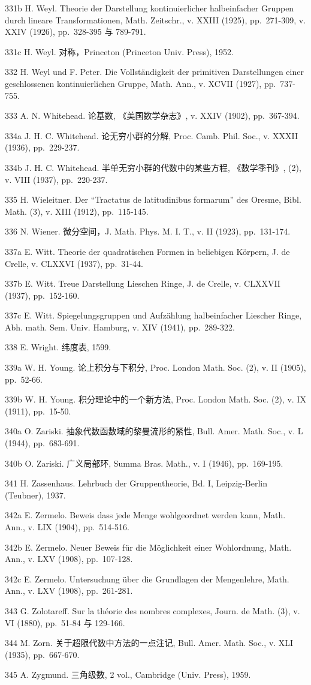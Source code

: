 331b H. Weyl. Theorie der Darstellung kontinuierlicher halbeinfacher Gruppen durch lineare Transformationen, Math. Zeitschr., v. XXIII (1925), pp.~271-309, v. XXIV (1926), pp.~328-395 与 789-791.

331c H. Weyl. 对称，Princeton (Princeton Univ. Press), 1952.

332 H. Weyl und F. Peter. Die Vollständigkeit der primitiven Darstellungen einer geschlossenen kontinuierlichen Gruppe, Math. Ann., v. XCVII (1927), pp.~737-755.

333 A. N. Whitehead. 论基数, 《美国数学杂志》, v. XXIV (1902), pp.~367-394.

334a J. H. C. Whitehead. 论无穷小群的分解, Proc. Camb. Phil. Soc., v. XXXII (1936), pp.~229-237.

334b J. H. C. Whitehead. 半单无穷小群的代数中的某些方程, 《数学季刊》, (2), v. VIII (1937), pp.~220-237.

335 H. Wieleitner. Der ``Tractatus de latitudinibus formarum'' des Oresme, Bibl. Math. (3), v. XIII (1912), pp.~115-145.

336 N. Wiener. 微分空间，J. Math. Phys. M. I. T., v. II (1923), pp.~131-174.

337a E. Witt. Theorie der quadratischen Formen in beliebigen Körpern, J. de Crelle, v. CLXXVI (1937), pp.~31-44.

337b E. Witt. Treue Darstellung Lieschen Ringe, J. de Crelle, v. CLXXVII (1937), pp.~152-160.

337c E. Witt. Spiegelungsgruppen und Aufzählung halbeinfacher Liescher Ringe, Abh. math. Sem. Univ. Hamburg, v. XIV (1941), pp.~289-322.

338 E. Wright. 纬度表, 1599.

339a W. H. Young. 论上积分与下积分, Proc. London Math. Soc. (2), v. II (1905), pp.~52-66.

339b W. H. Young. 积分理论中的一个新方法, Proc. London Math. Soc. (2), v. IX (1911), pp.~15-50.

340a O. Zariski. 抽象代数函数域的黎曼流形的紧性, Bull. Amer. Math. Soc., v. L (1944), pp.~683-691.

340b O. Zariski. 广义局部环, Summa Bras. Math., v. I (1946), pp.~169-195.

341 H. Zassenhaus. Lehrbuch der Gruppentheorie, Bd. I, Leipzig-Berlin (Teubner), 1937.

342a E. Zermelo. Beweis dass jede Menge wohlgeordnet werden kann, Math. Ann., v. LIX (1904), pp.~514-516.

342b E. Zermelo. Neuer Beweis für die Möglichkeit einer Wohlordnung, Math. Ann., v. LXV (1908), pp.~107-128.

342c E. Zermelo. Untersuchung über die Grundlagen der Mengenlehre, Math. Ann., v. LXV (1908), pp.~261-281.

343 G. Zolotareff. Sur la théorie des nombres complexes, Journ. de Math. (3), v. VI (1880), pp.~51-84 与 129-166.

344 M. Zorn. 关于超限代数中方法的一点注记, Bull. Amer. Math. Soc., v. XLI (1935), pp.~667-670.

345 A. Zygmund. 三角级数, 2 vol., Cambridge (Univ. Press), 1959.
